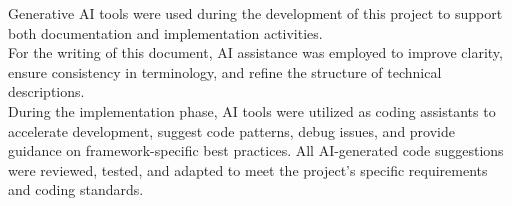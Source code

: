 \noindent
Generative AI tools were used during the development of this project to support both documentation and implementation activities. \\
For the writing of this document, AI assistance was employed to improve clarity, ensure consistency in terminology, and refine the structure of technical descriptions. \\
During the implementation phase, AI tools were utilized as coding assistants to accelerate development, suggest code patterns, debug issues, and provide guidance on framework-specific best practices. All AI-generated code suggestions were reviewed, tested, and adapted to meet the project's specific requirements and coding standards.